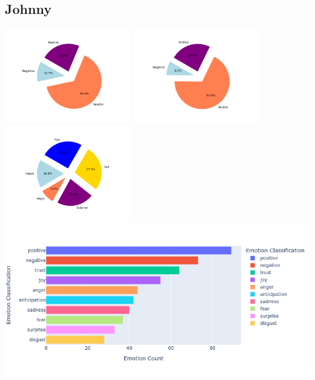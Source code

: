 \documentclass[a4paper,12pt]{article}
\begin{document}
	\subsection{Johnny}
	\begin{center}
		{\includegraphics[width=5.5cm]{johnnysVaderEmotionalPie.png}}
		{\includegraphics[width=5.5cm]{johnnysBlobEmotionalPie.png}}
		{\includegraphics[width=5.5cm]{johnnysEmotionalPie.png}}\\
		{\includegraphics[width=16cm]{johnnyNrcImage.png}}\\
	\end{center}
	\clearpage
\end{document}
